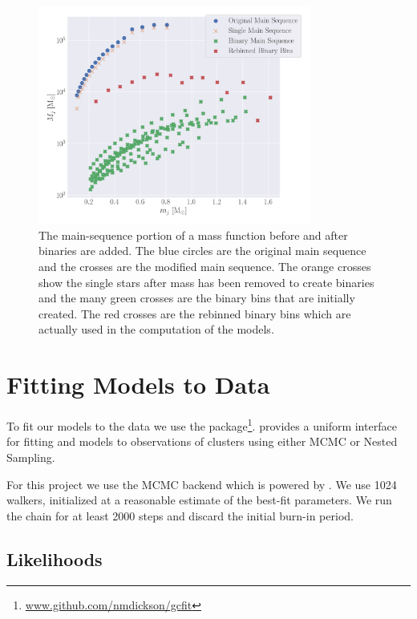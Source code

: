 \begin{figure}
    \centering
    \includegraphics[width=0.8\textwidth]{figures/shifted-mf.png}
    \caption{The main-sequence portion of a mass function before and after binaries are added. The blue
        circles are the original main sequence and the crosses are the modified main sequence. The orange
        crosses show the single stars after mass has been removed to create binaries and the many green
        crosses are the binary bins that are initially created. The red crosses are the rebinned binary bins
        which are actually used in the computation of the  models.}
    \label{fig:2/shifted-mf}
\end{figure}



\section{Fitting Models to Data}


To fit our models to the data we use the 
package\footnote{\url{www.github.com/nmdickson/gcfit}}.  provides a uniform interface
for fitting \evolvemf{} and  models to observations of clusters using either MCMC or
Nested Sampling.

For this project we use the MCMC backend which is powered by 
\citet{Foreman-Mackey2013,Foreman-Mackey2019}. We use 1024 walkers, initialized at a reasonable
estimate of the best-fit parameters. We run the chain for at least 2000 steps and discard the
initial burn-in period.

\subsection{Likelihoods}

